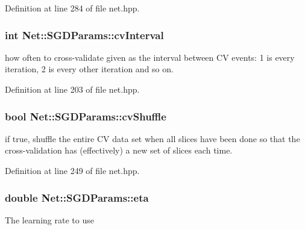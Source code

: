 Definition at line 284 of file net.\+hpp.

\subsubsection[{\texorpdfstring{cv\+Interval}{cvInterval}}]{\setlength{\rightskip}{0pt plus 5cm}int Net\+::\+S\+G\+D\+Params\+::cv\+Interval}\hypertarget{structNet_1_1SGDParams_abef7604394b7eac401efac3075f0445b}{}\label{structNet_1_1SGDParams_abef7604394b7eac401efac3075f0445b}


how often to cross-\/validate given as the interval between CV events\+: 1 is every iteration, 2 is every other iteration and so on. 



Definition at line 203 of file net.\+hpp.

\subsubsection[{\texorpdfstring{cv\+Shuffle}{cvShuffle}}]{\setlength{\rightskip}{0pt plus 5cm}bool Net\+::\+S\+G\+D\+Params\+::cv\+Shuffle}\hypertarget{structNet_1_1SGDParams_abe9b79b9386b8c16c6e8eb4e2f623f49}{}\label{structNet_1_1SGDParams_abe9b79b9386b8c16c6e8eb4e2f623f49}


if true, shuffle the entire CV data set when all slices have been done so that the cross-\/validation has (effectively) a new set of slices each time. 



Definition at line 249 of file net.\+hpp.

\subsubsection[{\texorpdfstring{eta}{eta}}]{\setlength{\rightskip}{0pt plus 5cm}double Net\+::\+S\+G\+D\+Params\+::eta}\hypertarget{structNet_1_1SGDParams_a2a092a8727e9f04f40f9c037b7594e53}{}\label{structNet_1_1SGDParams_a2a092a8727e9f04f40f9c037b7594e53}
The learning rate to use 

